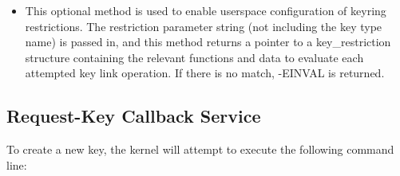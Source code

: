 \documentclass[a4paper,8pt,english]{sphinxmanual}
\def\PYGZus{\char`\_}
\begin{document}
\begin{itemize}
This method is permitted to return before the upcall is complete, but the
following function must be called under all circumstances to complete the
instantiation process, whether or not it succeeds, whether or not there's
an error:

\begin{Verbatim}[commandchars=\\\{\}]
void complete\PYGZus{}request\PYGZus{}key(struct key\PYGZus{}construction *cons, int error);
\end{Verbatim}

The error parameter should be 0 on success, -ve on error.  The
construction record is destroyed by this action and the authorisation key
will be revoked.  If an error is indicated, the key under construction
will be negatively instantiated if it wasn't already instantiated.

If this method returns an error, that error will be returned to the
caller of request\_key*().  complete\_request\_key() must be called prior to
returning.

The key under construction and the authorisation key can be found in the
key\_construction struct pointed to by cons:
\begin{itemize}
\item {} 

The key under construction.

\item {} 

The authorisation key.

\end{itemize}

\item {} 

This optional method is used to enable userspace configuration of keyring
restrictions. The restriction parameter string (not including the key type
name) is passed in, and this method returns a pointer to a key\_restriction
structure containing the relevant functions and data to evaluate each
attempted key link operation. If there is no match, -EINVAL is returned.

\end{itemize}


\subsection{Request-Key Callback Service}
\label{security/keys/core:request-key-callback-service}
To create a new key, the kernel will attempt to execute the following command
line:
\end{document}
